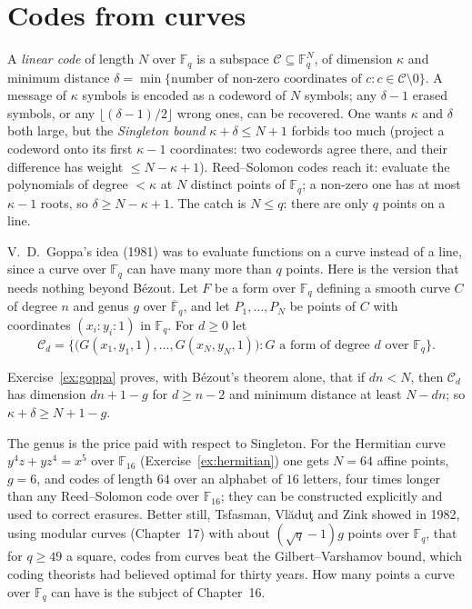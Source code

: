 \section{Codes from curves}\label{sec:goppa}

A \emph{linear code} of length $N$ over $\mathbb F_q$ is a subspace $\mathcal C\subseteq\mathbb F_q^N$, of dimension $\kappa$ and minimum distance
$\delta=\min\{\text{number of non-zero coordinates of }c:c\in\mathcal C\setminus0\}$. A message of $\kappa$ symbols is encoded as a codeword of $N$ symbols;
any $\delta-1$ erased symbols, or any $\lfloor(\delta-1)/2\rfloor$ wrong ones, can be recovered. One wants $\kappa$ and $\delta$ both large, but the
\emph{Singleton bound} $\kappa+\delta\le N+1$ forbids too much (project a codeword onto its first $\kappa-1$ coordinates: two codewords agree there, and their
difference has weight $\le N-\kappa+1$). Reed--Solomon codes reach it: evaluate the polynomials of degree $<\kappa$ at $N$ distinct points of $\mathbb F_q$;
a non-zero one has at most $\kappa-1$ roots, so $\delta\ge N-\kappa+1$. The catch is $N\le q$: there are only $q$ points on a line.

V.~D.~Goppa's idea (1981) was to evaluate functions on a curve instead of a line, since a curve over $\mathbb F_q$ can have many more than $q$ points. Here is
the version that needs nothing beyond B\'ezout. Let $F$ be a form over $\mathbb F_q$ defining a smooth curve $C$ of degree $n$ and genus $g$ over
$\overline{\mathbb F}_q$, and let $P_1,\dots,P_N$ be points of $C$ with coordinates $(x_i:y_i:1)$ in $\mathbb F_q$. For $d\ge0$ let
\[
\mathcal C_d=\bigl\{\bigl(G(x_1,y_1,1),\dots,G(x_N,y_N,1)\bigr):G\text{ a form of degree }d\text{ over }\mathbb F_q\bigr\}.
\]

Exercise~\ref{ex:goppa} proves, with B\'ezout's theorem alone, that if $dn<N$, then $\mathcal C_d$ has dimension $dn+1-g$ for $d\ge n-2$ and
minimum distance at least $N-dn$; so $\kappa+\delta\ge N+1-g$.

The genus is the price paid with respect to Singleton. For the Hermitian curve $y^4z+yz^4=x^5$ over $\mathbb F_{16}$ (Exercise~\ref{ex:hermitian}) one
gets $N=64$ affine points, $g=6$, and codes of length $64$ over an alphabet of $16$ letters, four times longer than any Reed--Solomon code over
$\mathbb F_{16}$; they can be constructed explicitly and used to correct erasures. Better still, Tsfasman, Vl\u{a}du\c{t} and Zink showed in 1982, using modular curves
(Chapter~17) with about $(\sqrt q-1)g$ points over $\mathbb F_q$, that for $q\ge49$ a square, codes from curves beat the Gilbert--Varshamov bound, which
coding theorists had believed optimal for thirty years. How many points a curve over $\mathbb F_q$ can have is the subject of Chapter~16.

